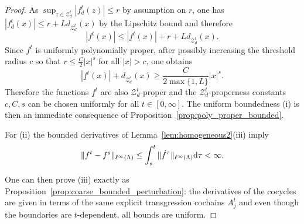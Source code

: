 \documentclass[12pt]{amsart}
\newcommand{\Zz}{{\mathcal Z}}
\newcommand{\difd}{\textup{d}}
\begin{document}
\begin{proof}
As $\sup_{z\in\Zz_d^{t}}|f_d^{t}(z)|\leq r$ by assumption on $r$, one has $|f_d^{t}(x)|\leq r+Ld_{\Zz_d^t}(x)$ by the Lipschitz bound and therefore
\[|f^{t}(x)|
 \leq
 |\underline f^{t}(x)|+r+L d_{\Zz_d^t}(x).\]
Since $f^t$ is uniformly polynomially proper, after possibly increasing the threshold radius $c$ so that $r\leq \frac C2|x|^s$ for all $|x|>c$, one obtains
\[|\underline f^{t}(x)|+ d_{\Zz_d^t}(x)
 \geq
 \frac{C}{2\max\{1,L\}}|x|^s.\]
Therefore the functions $\underline{f}^t$ are also $\Zz_d^t$-proper and the $\Zz_d^t$-properness constants $c,C,s$ can be chosen uniformly for all $t\in [0,\infty]$.
The uniform boundedness (i) is then an immediate consequence of Proposition~\ref{prop:poly_proper_bounded}.

For (ii) the bounded derivatives of Lemma~\ref{lem:homogeneous2}(iii) imply
$$\|f^t-f^s\|_{\ell^\infty(\Lambda)} \leq \int_s^t \| \dot{f}^\tau\|_{\ell^\infty(\Lambda)} \difd\tau <\infty.$$

One can then prove (iii) exactly as Proposition~\ref{prop:coarse_bounded_perturbation}: the derivatives of the cocycles are given in terms of the same explicit transgression cochains $A_j^t$ and even though the boundaries are $t$-dependent, all bounds are uniform.
\end{proof}
\end{document}
